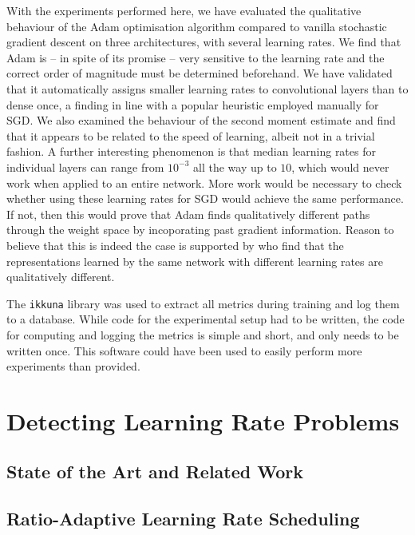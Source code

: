 With the experiments performed here, we have evaluated the qualitative behaviour
of the Adam optimisation algorithm compared to vanilla stochastic gradient
descent on three architectures, with several learning rates. We find that Adam
is -- in spite of its promise -- very sensitive to the learning rate and the
correct order of magnitude must be determined beforehand. We have validated that
it automatically assigns smaller learning rates to convolutional layers than to
dense once, a finding in line with a popular heuristic employed manually for
SGD. We also examined the behaviour of the second moment estimate and find that
it appears to be related to the speed of learning, albeit not in a trivial
fashion. A further interesting phenomenon is that median learning rates for
individual layers can range from $10^{-3}$ all the way up to $10$, which would
never work when applied to an entire network. More work would be necessary to
check whether using these learning rates for SGD would achieve the same
performance. If not, then this would prove that Adam finds qualitatively
different paths through the weight space by incoporating past gradient
information. Reason to believe that this is indeed the case is supported by
\citet{NIPS2018_7815} who find that the representations learned by the same
network with different learning rates are qualitatively different.

The \texttt{ikkuna} library was used to extract all metrics during training and
log them to a database. While code for the experimental setup had to be written,
the code for computing and logging the metrics is simple and short, and only
needs to be written once. This software could have been used to easily perform
more experiments than \citet{kingma2014adam} provided.

\section{Detecting Learning Rate Problems}%
\label{sec:detecting_learning_rate_problems}

\subsection{State of the Art and Related Work}%

\subsection{Ratio-Adaptive Learning Rate Scheduling}%
\label{sub:ratio_adaptive_learning_rate_scheduling}

